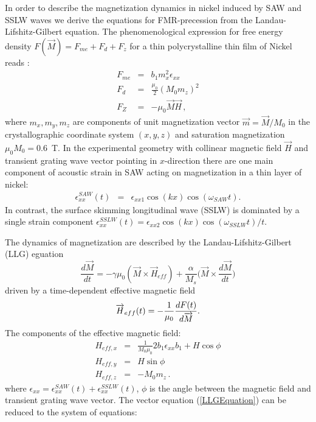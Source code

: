 \documentclass[preprint,superscriptaddress]{revtex4}
\begin{document}
In order to describe the magnetization dynamics in nickel induced
by SAW and SSLW waves we derive the equations for FMR-precession
from the Landau-Lifshitz-Gilbert equation. The phenomenological
expression for free energy density
$F(\overrightarrow{M})=F_{me}+F_d+F_z$ for a thin polycrystalline
thin film of Nickel reads \cite{delaFuente04JPCM16}:
\begin{eqnarray}
\label{me-term}
F_{me}&=&b_1m^2_x\epsilon_{xx}\,\\
\label{ms-term} F_d&=&\frac{\mu_0}{2}(M_0 m_z)^2\\
\label{Zeeman-term}
F_Z&=&-{\mu_0}\overrightarrow{M}\overrightarrow{H}\,,
\end{eqnarray}
where $m_x,m_y,m_z$ are components of unit magnetization vector
$\overrightarrow{m}=\overrightarrow{M}/M_0$ in the
crystallographic coordinate system $(x,y,z)$ and saturation
magnetization $\mu_0M_0=0.6$~T. In the experimental geometry with
collinear magnetic field $\overrightarrow{H}$ and transient
grating wave vector pointing in $x$-direction there are one main
component of acoustic strain in SAW acting on
magnetization in a thin layer of nickel:
\begin{eqnarray}
\label{SAW_strain}
\epsilon^{SAW}_{xx}(t)&=&\epsilon_{xx1}\cos(kx)\cos(\omega_{SAW}t).
\end{eqnarray}
In contrast, the surface skimming longitudinal wave (SSLW) is
dominated by a single strain component
$\epsilon^{SSLW}_{xx}(t)=\epsilon_{xx2}\cos(kx)\cos(\omega_{SSLW}t)/t$.

The dynamics of magnetization are described by the
Landau-Lifshitz-Gilbert (LLG) eguation
\begin{equation}\label{LLGEquation}
\frac{d\overrightarrow{M}}{dt}=-\gamma\mu_0
(\overrightarrow{M}\times\overrightarrow{H}_{eff})
+\frac{\alpha}{M_s} \bigg (\overrightarrow{M}\times
\frac{d\overrightarrow{M}}{dt}\bigg )
\end{equation}
driven by a time-dependent effective magnetic field
\begin{equation}
\label{Heff}
\overrightarrow{H}_{eff}(t)=-\frac{1}{\mu_0}\frac{dF(t)}{d\overrightarrow{M}}\\.
\end{equation}
The components of the effective magnetic field:
\begin{eqnarray}
\label{Heff_comp}
H_{eff,x}&=&\frac{1}{M_0\mu_0}2b_1\epsilon_{xx}b_1+H\cos\phi  \label{Heff_comp1}
\\
H_{eff,y}&=&H\sin\phi \label{Heff_comp2}
\\
H_{eff,z}&=&-M_0m_z \label{Heff_comp3}
\,.
\end{eqnarray}
where $\epsilon_{xx}=\epsilon^{SAW}_{xx}(t)+\epsilon^{SSLW}_{xx}(t)$,
$\phi$ is the angle between the magnetic field and
transient grating wave vector.
The vector equation  (\ref{LLGEquation}) can be reduced to the system of equations:
\end{document}

